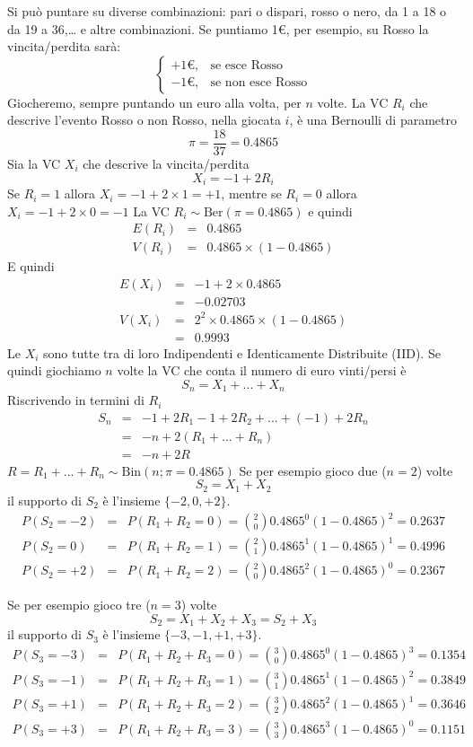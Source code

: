 \documentclass[
  11pt,
]{book}
\theoremstyle{mytheoremstyle}
\theoremstyle{mydefstyle}
\begin{document}
Si può puntare su diverse combinazioni: pari o dispari, rosso o nero, da
1 a 18 o da 19 a 36,\ldots{} e altre combinazioni. Se puntiamo 1€, per
esempio, su Rosso la vincita/perdita sarà: \[
\begin{cases}
+1€, &\text{se esce Rosso}\\
-1€, &\text{se non esce Rosso}
\end{cases}
\] Giocheremo, sempre puntando un euro alla volta, per \(n\) volte. La VC
\(R_i\) che descrive l'evento Rosso o non Rosso, nella giocata \(i\), è una
Bernoulli di parametro \[
\pi=\frac{18}{37}=0.4865
\] Sia la VC \(X_i\) che descrive la vincita/perdita \[X_i=-1+2R_i\] Se
\(R_i=1\) allora \(X_i=-1+2\times 1=+1\), mentre se \(R_i=0\) allora
\(X_i=-1+2\times 0=-1\) La VC
\(R_i\sim\text{Ber}(\pi=0.4865)\) e quindi
\begin{eqnarray*}
E(R_i) &=& 0.4865\\
V(R_i) &=& 0.4865\times(1-0.4865)
\end{eqnarray*} E quindi \begin{eqnarray*}
E(X_i) &=& -1+2\times 0.4865\\
&=&-0.02703\\
V(X_i) &=& 2^2\times 0.4865\times(1-0.4865)\\
&=& 0.9993
\end{eqnarray*} Le \(X_i\) sono tutte tra di loro Indipendenti e
Identicamente Distribuite (IID). Se quindi giochiamo \(n\) volte la VC che
conta il numero di euro vinti/persi è \[
S_n = X_1+...+X_n
\] Riscrivendo in termini di \(R_i\) \begin{eqnarray*}
S_n &=& -1 + 2R_1 -1 + 2R_2 +...+(-1)+2R_n\\
    &=& -n + 2(R_1+...+R_n)\\
    &=& -n + 2R
\end{eqnarray*}
\(R=R_1+...+R_n\sim \text{Bin}(n;\pi=0.4865)\)
Se per esempio gioco due (\(n=2\)) volte \[
S_2 = X_1+X_2
\] il supporto di \(S_2\) è l'insieme \(\{-2,0,+2\}\). \begin{eqnarray*}
P(S_2=-2)&=&P(R_1+R_2=0)= \binom{2}{0}0.4865^0(1-0.4865)^2=0.2637\\
P(S_2=0)&=&P(R_1+R_2=1)= \binom{2}{1}0.4865^1(1-0.4865)^1=0.4996\\
P(S_2=+2)&=&P(R_1+R_2=2)= \binom{2}{0}0.4865^2(1-0.4865)^0=0.2367
\end{eqnarray*}

Se per esempio gioco tre (\(n=3\)) volte \[
S_2 = X_1+X_2+X_3=S_2+X_3
\] il supporto di \(S_3\) è l'insieme \(\{-3,-1,+1,+3\}\). \begin{eqnarray*}
P(S_3=-3)&=&P(R_1+R_2+R_3=0)= \binom{3}{0}0.4865^0(1-0.4865)^3=0.1354\\
P(S_3=-1)&=&P(R_1+R_2+R_3=1)= \binom{3}{1}0.4865^1(1-0.4865)^2=0.3849\\
P(S_3=+1)&=&P(R_1+R_2+R_3=2)= \binom{3}{2}0.4865^2(1-0.4865)^1=0.3646\\
P(S_3=+3)&=&P(R_1+R_2+R_3=3)= \binom{3}{3}0.4865^3(1-0.4865)^0=0.1151
\end{eqnarray*}
\end{document}
